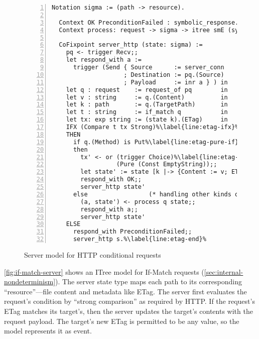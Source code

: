 \begin{figure}
\begin{lstlisting}[numbers=left]
  Notation sigma := (path -> resource).

  Context OK PreconditionFailed : symbolic_response.
  Context process: request -> sigma -> itree smE (symbolic_response * sigma).

  CoFixpoint server_http (state: sigma) :=
    pq <- trigger Recv;;
    let respond_with a :=
      trigger (Send { Source      := server_conn
                    ; Destination := pq.(Source)
                    ; Payload     := inr a } ) in
    let q : request    := request_of pq        in
    let v : string     := q.(Content)          in
    let k : path       := q.(TargetPath)       in
    let t : string     := if_match q           in
    let tx: exp string := (state k).(ETag)     in
    IFX (Compare t tx Strong)%\label{line:etag-ifx}%
    THEN
      if q.(Method) is Put%\label{line:etag-pure-if}%
      then
        tx' <- or (trigger Choice)%\label{line:etag-choice}%
                  (Pure (Const EmptyString));;
        let state' := state [k |-> {Content := v; ETag := tx'}] in
        respond_with OK;;
        server_http state'
      else                 (* handling other kinds of requests *)
        (a, state') <- process q state;;
        respond_with a;;
        server_http state'
    ELSE
      respond_with PreconditionFailed;;
      server_http s.%\label{line:etag-end}%
\end{lstlisting}
\caption{Server model for HTTP conditional requests}
\label{fig:if-match-server}
\end{figure}

\autoref{fig:if-match-server} shows an ITree model for If-Match requests 
(\autoref{sec:internal-nondeterminism}).  The server state type  maps
each path to its corresponding ``resource''---file content and metadata like
ETag.  The server first evaluates the request's  condition by
``strong comparison'' as required by HTTP.  If the request's ETag matches its
target's, then the server updates the target's contents with the request
payload.  The target's new ETag  is permitted to be any value, so the
model represents it as  event.


